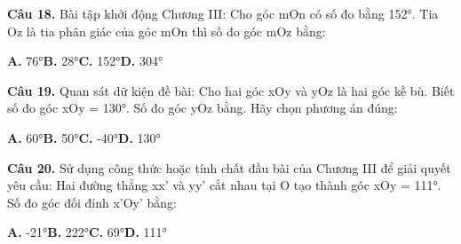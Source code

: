 \documentclass[11pt,a4paper]{article}
\begin{document}
\textbf{\color{primary} Câu 18.} Bài tập khởi động Chương III: Cho góc mOn có số đo bằng 152°. Tia Oz là tia phân giác của góc mOn thì số đo góc mOz bằng:\par
\hspace*{1.5em}\textbf{A.} 76°\quad\quad \textbf{B.} 28°\quad\quad \textbf{C.} 152°\quad\quad \textbf{D.} 304°\par\vspace{2pt}
\textbf{\color{primary} Câu 19.} Quan sát dữ kiện đề bài: Cho hai góc xOy và yOz là hai góc kề bù. Biết số đo góc xOy = 130°. Số đo góc yOz bằng. Hãy chọn phương án đúng:\par
\hspace*{1.5em}\textbf{A.} 60°\quad\quad \textbf{B.} 50°\quad\quad \textbf{C.} -40°\quad\quad \textbf{D.} 130°\par\vspace{2pt}
\textbf{\color{primary} Câu 20.} Sử dụng công thức hoặc tính chất đầu bài của Chương III để giải quyết yêu cầu: Hai đường thẳng xx' và yy' cắt nhau tại O tạo thành góc xOy = 111°. Số đo góc đối đỉnh x'Oy' bằng:\par
\hspace*{1.5em}\textbf{A.} -21°\quad\quad \textbf{B.} 222°\quad\quad \textbf{C.} 69°\quad\quad \textbf{D.} 111°\par\vspace{2pt}
\end{document}
